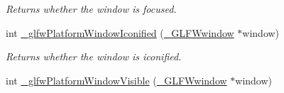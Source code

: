 \begin{DoxyCompactItemize}
\begin{DoxyCompactList}\small\item\em Returns whether the window is focused. \end{DoxyCompactList}\item 
\hypertarget{group__platform_ga1c55b62c3e61ce1e238fc339a712bc93}{}int \hyperlink{group__platform_ga1c55b62c3e61ce1e238fc339a712bc93}{\+\_\+glfw\+Platform\+Window\+Iconified} (\hyperlink{struct__GLFWwindow}{\+\_\+\+G\+L\+F\+Wwindow} $\ast$window)\label{group__platform_ga1c55b62c3e61ce1e238fc339a712bc93}

\begin{DoxyCompactList}\small\item\em Returns whether the window is iconified. \end{DoxyCompactList}\item 
\hypertarget{group__platform_ga4d6dcb902a778ac7a805172ac3955135}{}int \hyperlink{group__platform_ga4d6dcb902a778ac7a805172ac3955135}{\+\_\+glfw\+Platform\+Window\+Visible} (\hyperlink{struct__GLFWwindow}{\+\_\+\+G\+L\+F\+Wwindow} $\ast$window)\label{group__platform_ga4d6dcb902a778ac7a805172ac3955135}


\end{DoxyCompactItemize}
